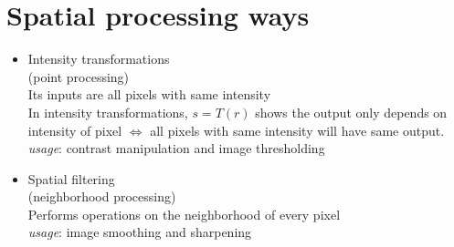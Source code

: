 \section{Spatial processing ways}

\begin{itemize}
\item
  Intensity transformations\\
  (point processing)\\
  Its inputs are all pixels with same intensity\\
  In intensity transformations, $s=T(r)$ shows the output only depends on
  intensity of pixel $\Leftrightarrow$  all pixels with same intensity will have
  same output.\\
  \emph{usage}: contrast manipulation and image thresholding
\item
  Spatial ﬁltering\\
  (neighborhood processing)\\
  Performs operations on the neighborhood of every pixel\\
  \emph{usage}: image smoothing and sharpening
\end{itemize}
